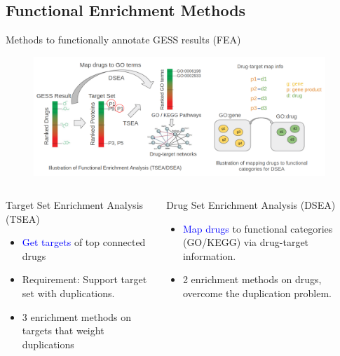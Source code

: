 \documentclass[10pt]{beamer}
\begin{document}
\subsection{Functional Enrichment Methods}
\begin{frame}{Methods to functionally annotate GESS results (FEA)}
  \vspace{-0.3cm}
  \begin{figure}
      \includegraphics[width=11cm]{demo/images/fea_illu.png}
  \end{figure}
  \vspace{-0.8cm}
  \small
   \begin{columns}[T,onlytextwidth]
      \begin{alertblock}{\small Target Set Enrichment Analysis (TSEA)}
        \vspace{-0.2cm}
        \begin{itemize} \itemsep0pt
            \item \textcolor{blue}{Get targets} of top connected drugs
            \item \alert{Requirement:} Support target set with duplications. 
            \item 3 enrichment methods \alert{on targets} that weight duplications
        \end{itemize}
      \end{alertblock}
      \begin{alertblock}{\small Drug Set Enrichment Analysis (DSEA)}
        \vspace{-0.2cm}
        \begin{itemize}
            \item \textcolor{blue}{Map drugs} to functional categories (GO/KEGG) via drug-target information. 
            \item 2 enrichment methods \alert{on drugs}, overcome the duplication problem.
        \end{itemize}
      \end{alertblock}
  \end{columns}
\end{frame}
\end{document}
